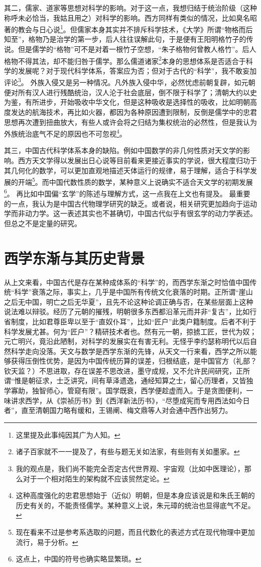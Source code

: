 \documentclass{article}
\begin{document}
其二，儒家、道家等思想对科学的影响。对于这一点，我想归结于统治阶级（这种称呼未必恰当，我姑且用之）对科学的影响。西方同样有类似的情况，比如臭名昭著的教会与日心说\footnote{这里提及此事纯因其广为人知。}。但儒家本身其实并不排斥科学技术，《大学》所谓“物格而后知至”，格物乃是治学的第一步，后人往往误解此句，于是便有王阳明格竹子的传说。但是儒学的“格物”可不是对着一根竹子空想，“朱子格物何曾教人格竹”。后人格物不得其法，却不能归咎于儒学。那么儒道诸家\footnote{诸子百家就不一一提及了，有些与题无关如法家，有些则有关如墨家。}本身的思想体系是否适合于科学的发展呢？对于现代科学体系，答案应为否；但对于古代的“科学”，我不敢妄加评论\footnote{我的观点是，我们尚不能完全否定古代世界观、宇宙观（比如中医理论），那么对于一个相对陌生的架构就不应该贸然定论。}。
外族入侵又是另一种情况。凡外族入侵中华，必然忧虑前朝复辟，如元朝便对所有汉人进行残酷统治，汉人沦于社会底层，倒不限于科学了；清朝大约以史为鉴，有所进步，开始吸收中华文化，但是这种吸收是选择性的吸收，比如明朝高度发达的航海技术，再比如火器，都因为各种原因遭到限制，反倒是儒学中的忠君思想再次遭到扭曲放大，有些人或许会将之归结为集权统治的必然性，但是我认为外族统治底气不足的原因也不可忽视\footnote{这种高度强化的忠君思想始于（近似）明朝，但是本身应该说是和朱氏王朝的历史有关的，不能责怪儒学。某种意义上说，朱元璋的统治也显得底气不足。}。

其三，中国古代科学体系本身的缺陷。例如中国数学的非几何性质对天文学的影响。西方天文学得以发展出日心说等目前看来更接近事实的学说，很大程度归功于其几何化的数学，可以更加直观地描述天体运行的规律，易于理解，适合于科学发展的开端\footnote{现在看来不过是参考系选取的问题，而且代数化的表述方式在现代物理中更加流行，易于分析。}。而中国代数性质的数学，某种意义上说确实不适合天文学的初期发展\footnote{这点上，中国的符号也确实略显繁琐。}。
再比如中国偏“玄学”的陈述与理解方式，这一点我在上文也有提及。
最重要的一点，我认为是中国古代物理学研究的缺乏。或者说，相关研究更加趋向于运动学而非动力学。这一表述其实也不甚确切，中国古代似乎有很玄学的动力学表述。但总之不是定量的研究。
\section{西学东渐与其历史背景}
从上文来看，中国古代是存在某种成体系的“科学”的，而西学东渐之时恰值中国传统“科学”衰落之际，事实上，几乎是中国所有传统文化衰落的时期。正所谓“崖山之后无中国，明亡之后无华夏”，且先不论这种论调正确与否，在某些层面上这种说法难以辩驳。经历了元朝的摧残，明朝很多东西都沿革元而并非“复古”，比如行省制度，比如君尊臣卑以至于“直奴仆耳”，比如“匠户”此类户籍制度。后者不利于科学发展尤甚。何为“匠户”？精研技术者也。然有元一朝，掠掳工匠，世代为奴；元亡明兴，竟沿此陋制，对科学的发展实在有害无利。无怪乎李约瑟称明代以后自然科学走向没落。天文与数学是西学东渐的先锋，从天文一行来看，西学之所以能够获得压倒性优势，是因为中国传统历算的误差，归根结底，是中国官方（礼部？钦天监？）不思进取，存在误差不思改进，墨守成规，又不允许民间研究，正所谓“惟是朝征求，士乏讲究，间有草泽遗逸，通经知算之士，留心历理者，又皆独学寡助，独智师心，管窥有限”。国学既衰，西学便趁虚而入。于是贪图便利，一味讲求西学，从《崇祯历书》到《西洋新法历书》，“尽堕成宪而专用西法如今日者”，直至清朝国力略有缓和，王锡阐、梅文鼎等人对会通中西作出努力。
\end{document}
